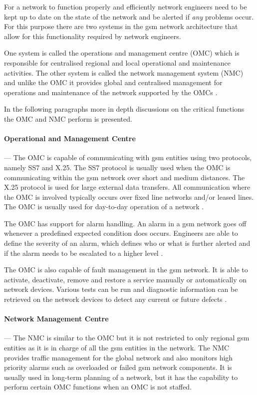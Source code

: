For a network to function properly and efficiently network engineers need to be kept up to date on the state of the network and be alerted if \emph{any} problems occur. For this purpose there are two systems in the \gls{gsm} network architecture that allow for this functionality required by network engineers. 

One system is called the operations and management centre (OMC) which is responsible for centralised regional and local operational and maintenance activities. The other system is called the network management system (NMC) and unlike the OMC it provides global and centralised management for operations and maintenance of the network supported by the OMCs \cite{GSMSysEngin}.

In the following paragraphs more in depth discussions on the critical functions the OMC and NMC perform is presented.

\paragraph{Operational and Management Centre}
--- The OMC is capable of communicating with \gls{gsm} entities using two protocols, namely SS7 and X.25. The SS7 protocol is usually used when the OMC is communicating within the \gls{gsm} network over short and medium distances. The X.25 protocol is used for large external data transfers. All communication where the OMC is involved typically occurs over fixed line networks and/or leased lines. The OMC is usually used for day-to-day operation of a network \cite{GSMSysEngin}.

The OMC has support for alarm handling. An alarm in a \gls{gsm} network goes off whenever a predefined expected condition does occurs. Engineers are able to define the severity of an alarm, which defines who or what is further alerted and if the alarm needs to be escalated to a higher level \cite{GSMSysEngin}.

The OMC is also capable of fault management in the \gls{gsm} network. It is able to activate, deactivate, remove and restore a service manually or automatically on network devices\cite{GSM92}. Various tests can be run and diagnostic information can be retrieved on the network devices to detect any current or future defects \cite{GSMSysEngin}.

\paragraph{Network Management Centre}
--- The NMC is similar to the OMC but it is not restricted to only regional \gls{gsm} entities as it is in charge of all the \gls{gsm} entities in the network. The NMC provides traffic management for the global network and also monitors high priority alarms such as overloaded or failed \gls{gsm} network components. It is usually used in long-term planning of a network, but it has the capability to perform certain OMC functions when an OMC is not staffed. 

